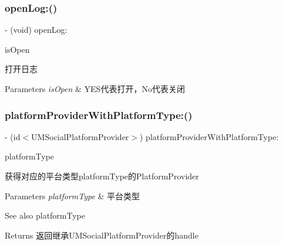 \subsubsection{\texorpdfstring{open\+Log\+:()}{openLog:()}\hspace{0.1cm}{\footnotesize\ttfamily [2/2]}}
{\footnotesize\ttfamily -\/ (void) open\+Log\+: \begin{DoxyParamCaption}\item[{(B\+O\+OL)}]{is\+Open }\end{DoxyParamCaption}}

打开日志


\begin{DoxyParams}{Parameters}
{\em is\+Open} & Y\+E\+S代表打开，\+No代表关闭 \\
\hline
\end{DoxyParams}
\mbox{\label{interface_u_m_social_manager_a2fbdd1e6b0106d333c3abd33ad4a4984}} 
\subsubsection{\texorpdfstring{platform\+Provider\+With\+Platform\+Type\+:()}{platformProviderWithPlatformType:()}\hspace{0.1cm}{\footnotesize\ttfamily [1/2]}}
{\footnotesize\ttfamily -\/ (id$<$U\+M\+Social\+Platform\+Provider$>$) platform\+Provider\+With\+Platform\+Type\+: \begin{DoxyParamCaption}\item[{(U\+M\+Social\+Platform\+Type)}]{platform\+Type }\end{DoxyParamCaption}}

获得对应的平台类型platform\+Type的\+Platform\+Provider


\begin{DoxyParams}{Parameters}
{\em platform\+Type} & 平台类型 \\
\hline
\end{DoxyParams}
\begin{DoxySeeAlso}{See also}
platform\+Type
\end{DoxySeeAlso}
\begin{DoxyReturn}{Returns}
返回继承\+U\+M\+Social\+Platform\+Provider的handle 
\end{DoxyReturn}
\mbox{\label{interface_u_m_social_manager_a2fbdd1e6b0106d333c3abd33ad4a4984}} 

